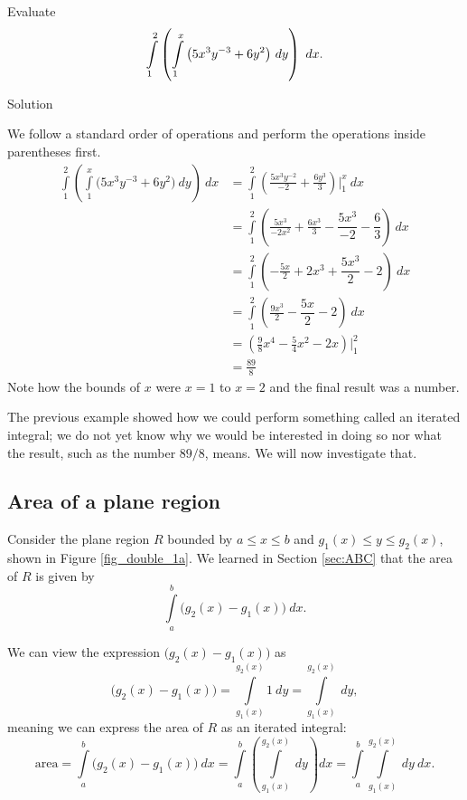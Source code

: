 \begin{example}\label{ex_iterated3}
Evaluate 
$$\ds \int\limits_1^2\left(\int\limits_1^x\big(5x^3y^{-3}+6y^2\big)\ dy\right)\ dx.$$

Solution 

We follow a standard order of operations and perform the operations inside parentheses first.
\begin{align*}
\int\limits_1^2\left(\int\limits_1^x\big(5x^3y^{-3}+6y^2\big)\ dy\right)\ dx &= \int\limits_1^2 \left(\frac{5x^3y^{-2}}{-2}+\frac{6y^3}{3}\right)\Bigg|_1^x\ dx \\
            & = \int\limits_1^2 \left(\frac{5x^3}{-2x^2}+\frac{6x^3}{3}-\dfrac{5x^3}{-2}-\dfrac{6}{3}\right)\ dx\\
            & = \int\limits_1^2 \left(-\frac{5x}{2}+2x^3+\dfrac{5x^3}{2}-2\right)\ dx\\
            & = \int\limits_1^2 \left(\frac{9x^3}{2}-\dfrac{5x}{2}-2\right)\ dx\\
			&= \left(\frac98x^4-\frac54x^2-2x\right)\Bigg|_1^2\\
			&= \frac{89}8
\end{align*}
Note how the bounds of $x$ were $x=1$ to $x=2$ and the final result was a number.
\end{example}


 

The previous example showed how we could perform something called an iterated integral; we do not yet know why we would be interested in doing so nor what the result, such as the number $89/8$, means. We will now investigate that. 

\subsection{Area of a plane region}

Consider the plane region $R$ bounded by $a\leq x\leq b$ and $g_1(x)\leq y\leq g_2(x)$, shown in Figure \ref{fig_double_1a}. We learned in Section \ref{sec:ABC} that the area of $R$ is given by 
$$\int\limits_a^b \big(g_2(x)-g_1(x)\big)\ dx.$$


We can  view the expression $\big(g_2(x)-g_1(x)\big)$ as 
$$\big(g_2(x)-g_1(x)\big) = \int\limits_{g_1(x)}^{g_2(x)} 1\ dy =\int\limits_{g_1(x)}^{g_2(x)} \ dy,$$
meaning we can express the area of $R$ as an iterated integral:
$$\text{area} = \int\limits_a^b \big(g_2(x)-g_1(x)\big)\ dx = \int\limits_a^b\left(\int\limits_{g_1(x)}^{g_2(x)} \ dy\right) dx =\int\limits_a^b\int\limits_{g_1(x)}^{g_2(x)} \ dy\ dx.$$

